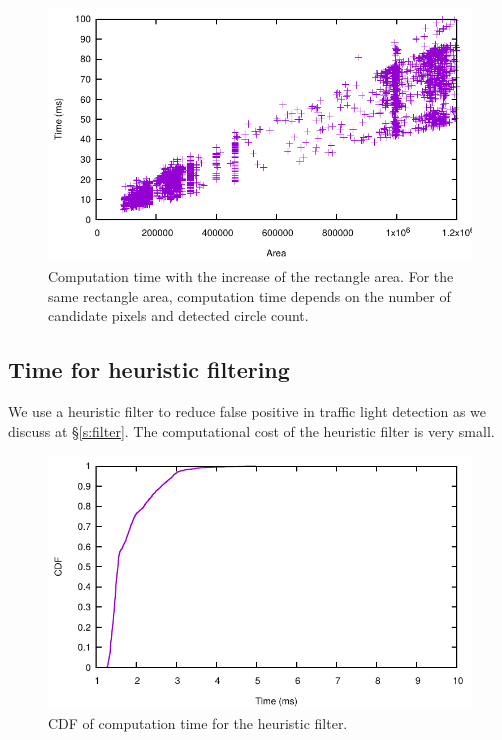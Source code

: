 \begin{figure}[ht!]
\centering
\includegraphics[width=5.2in]{plots/cloudy_recarea.pdf}
\caption{Computation time with the increase of the rectangle area. For the same rectangle area, computation time depends on the number of candidate pixels and detected circle count.}
\label{f:recarea}
\end{figure}



\subsection{Time for heuristic filtering}
We use a heuristic filter to reduce false positive in traffic light detection as we discuss at \S\ref{s:filter}.
The computational cost of the heuristic filter is very small.

\begin{figure}[ht!]
\centering
\includegraphics[width=5.2in]{plots/sunny_cdf_filter.pdf}
\caption{CDF of computation time for the heuristic filter.}
\label{f:cdf_fil}
\end{figure}

